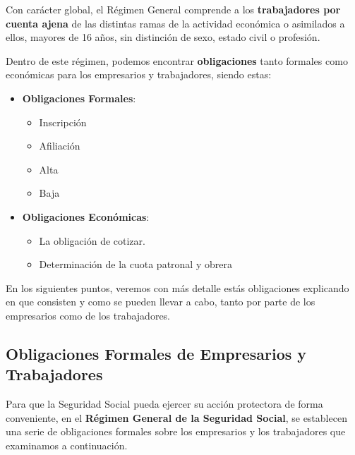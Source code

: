 Con carácter global, el Régimen General comprende a los \textbf{trabajadores por cuenta ajena} de las distintas ramas de la actividad económica o asimilados a ellos, mayores de 16 años, sin distinción de sexo, estado civil o profesión.  \cite{portalss01}

Dentro de este régimen, podemos encontrar \textbf{obligaciones} tanto formales como económicas para los empresarios y trabajadores,  siendo estas:

\begin{itemize}
    \item \textbf{Obligaciones Formales}:
    \begin{itemize}
        \item Inscripción
        \item Afiliación
        \item Alta
        \item Baja
    \end{itemize}

    \item \textbf{Obligaciones Económicas}:
    \begin{itemize}
        \item La obligación de cotizar.
        \item Determinación de la cuota patronal y obrera
    \end{itemize}
\end{itemize}

En los siguientes puntos, veremos con más detalle estás obligaciones explicando en que consisten y como se pueden llevar a cabo, tanto por parte de los empresarios como de los trabajadores.

\subsection{Obligaciones Formales de Empresarios y Trabajadores}
Para que la Seguridad Social pueda ejercer su acción protectora de forma conveniente, en el \textbf{Régimen General de la Seguridad Social}, se establecen una serie de obligaciones formales sobre los empresarios y los trabajadores que examinamos a continuación.


